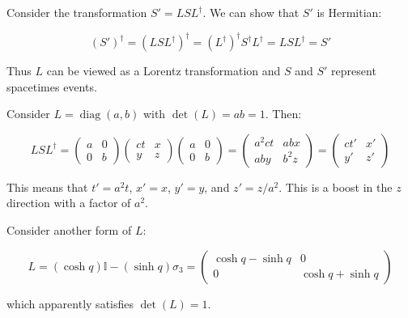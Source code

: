 \documentclass[12pt]{article}
\begin{document}
Consider the transformation $S' = LSL^{\dagger}$. We can show that $S'$ is Hermitian:

\begin{equation}
    (S')^{\dagger} = (LSL^{\dagger})^{\dagger} = (L^{\dagger})^{\dagger} S^{\dagger} L^{\dagger} = LSL^{\dagger} = S'
\end{equation}

Thus $L$ can be viewed as a Lorentz transformation and $S$ and $S'$ represent spacetimes events.

Consider $L = \operatorname{diag}{(a, b)}$ with $\det(L) = ab = 1$. Then:

\begin{equation}
    LSL^{\dagger} =
    \begin{pmatrix}
        a & 0 \\
        0 & b
    \end{pmatrix}
    \begin{pmatrix}
        ct & x \\
        y  & z
    \end{pmatrix}
    \begin{pmatrix}
        a & 0 \\
        0 & b
    \end{pmatrix}
    =
    \begin{pmatrix}
        a^{2} ct & ab x    \\
        ab y     & b^{2} z
    \end{pmatrix}
    =
    \begin{pmatrix}
        ct' & x' \\
        y'  & z'
    \end{pmatrix}
\end{equation}

This means that $t' = a^{2} t$, $x' = x$, $y' = y$, and $z' = z/a^{2}$. This is a boost in the $z$ direction with a factor of $a^{2}$.

Consider another form of $L$:

\begin{equation}
    L = (\cosh{q}) \mathbb{I} - (\sinh{q}) \sigma_{3}
    =
    \begin{pmatrix}
        \cosh{q}-\sinh{q} & 0                 \\
        0                 & \cosh{q}+\sinh{q}
    \end{pmatrix}
\end{equation}

which apparently satisfies $\det(L) = 1$.
\end{document}
